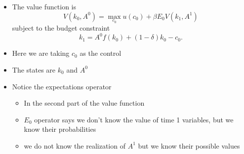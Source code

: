 \documentclass[notes=show]{beamer}
\begin{document}
\begin{frame}%


\begin{itemize}
\item The value function is%
\[
V(k_{0},A^{0})=\max_{c_{0}}u(c_{0})+\beta E_{0}V\left( k_{1},A^{1}\right) 
\]%
subject to the budget constraint%
\[
k_{1}=A^{0}f(k_{0})+(1-\delta )k_{0}-c_{0}. 
\]

\item Here we are taking $c_{0}$ as the control

\item The states are $k_{0}$ and $A^{0}$

\item Notice the expectations operator

\begin{itemize}
\item In the second part of the value function

\item $E_{0}$ operator says we don't know the value of time 1 variables, but
we know their probabilities

\item we do not know the realization of $A^{1}$ but we know their possible
values
\end{itemize}
\end{itemize}

\end{frame}%
\end{document}
